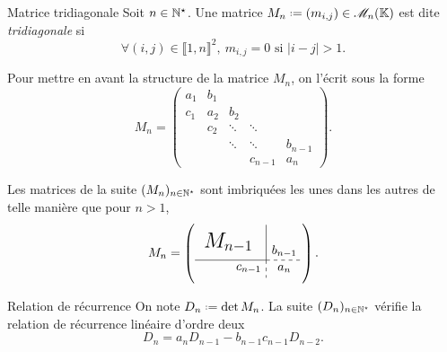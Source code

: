 \begin{defi}{Matrice tridiagonale}
    Soit $n \in \mathbb{N}^\star$. Une matrice $M_n \defeq (m_{i,j}) \in \M_n(\K)$ est dite \emph{tridiagonale} si
    $$\forall (i,j) \in \llbracket 1, n \rrbracket^2,\ m_{i,j} = 0 \text{ si } |i-j| > 1.$$
\end{defi}

Pour mettre en avant la structure de la matrice $M_n$, on l'écrit sous la forme
$$
M_n = \begin{pmatrix}
a_1 & b_1 \\
c_1 & a_2 & b_2 \\
& c_2 & \ddots & \ddots \\
& & \ddots & \ddots & b_{n-1} \\
& & & c_{n-1} & a_n
\end{pmatrix}.
$$

\newcommand{\mattrign}{
\left(\begin{gathered}
    \tikzpicture[every node/.style={anchor=south west}]
        \node[minimum width=1.5cm,minimum height=1cm] at (0.125,0.5) {\LARGE $M_{n-1}$};
        \node[minimum width=1.5cm,minimum height=0.5cm] at (0.75,0) {$c_{n-1}$};
        \node[minimum width=1cm,minimum height=0.5cm] at (2,0) {$a_n$};
        \node[minimum width=1cm,minimum height=1cm] at (2,0.25) {$b_{n-1}$};
        \draw (0,0.5) -- (2,0.5);
        \draw (2,0.5) -- (2,1.5);
        \draw[dashed] (2,0.5) -- (3,0.5);
        \draw[dashed] (2,0.5) -- (2,0);
    \endtikzpicture
    \end{gathered}\right)
}

\begin{remarque}
    Les matrices de la suite $(M_n)_{n \in \mathbb{N}^\star}$ sont imbriquées les unes dans les autres de telle manière que pour $n > 1$,
    $$M_n = \mattrign.$$
\end{remarque}


\begin{prop}{Relation de récurrence}
    On note $D_n \defeq \det M_n$. La suite $(D_n)_{n \in \mathbb{N}^\star}$ vérifie la relation de récurrence linéaire d'ordre deux 
    $$D_n = a_n D_{n-1} - b_{n-1}c_{n-1}D_{n-2}.$$
\end{prop}

\newcommand{\dettrign}{
\left|\begin{gathered}
    \tikzpicture[every node/.style={anchor=south west}]
        \node[minimum width=1.5cm,minimum height=1cm] at (0.125,0.5) {\LARGE $M_{n-1}$};
        \node[minimum width=1.5cm,minimum height=0.5cm] at (0.75,0) {$c_{n-1}$};
        \node[minimum width=1cm,minimum height=0.5cm] at (2,0) {$a_n$};
        \node[minimum width=1cm,minimum height=1cm] at (2,0.25) {$b_{n-1}$};
        \draw (0,0.5) -- (2,0.5);
        \draw (2,0.5) -- (2,1.5);
        \draw[dashed] (2,0.5) -- (3,0.5);
        \draw[dashed] (2,0.5) -- (2,0);
    \endtikzpicture
    \end{gathered}\right|
}


